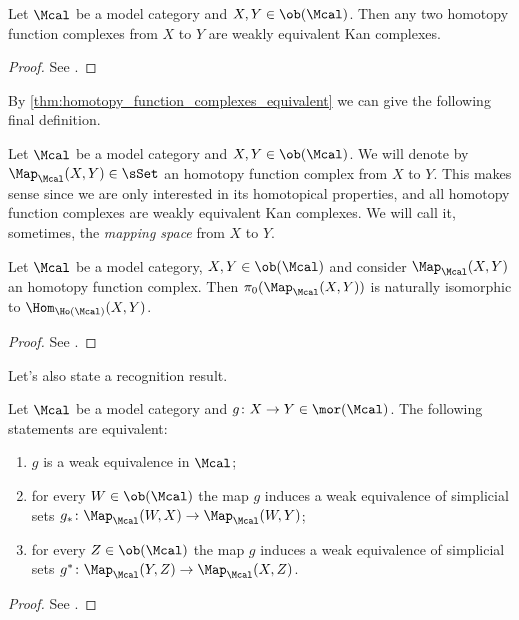         \begin{thm}
            \label{thm:homotopy_function_complexes_equivalent}
            Let $\Mcal$ be a model category and $X, Y \in \ob(\Mcal)$. Then any two homotopy function complexes from $X$ to $Y$ are weakly equivalent Kan complexes.
        \end{thm}
        \begin{proof}
            See \cite[Theorem~17.1.11, 17.2.11, 17.3.9, 17.4.6]{Hirs:loc}.
        \end{proof}

        By \cref{thm:homotopy_function_complexes_equivalent} we can give the following final definition.

        \begin{defn}
            \label{defn:mapping_space}
            Let $\Mcal$ be a model category and $X, Y \in \ob(\Mcal)$. We will denote by $\Map_{\Mcal}(X, Y) \in \sSet$ an homotopy function complex from $X$ to $Y$. This makes sense since we are only interested in its homotopical properties, and all homotopy function complexes are weakly equivalent Kan complexes. We will call it, sometimes, the \emph{mapping space} from $X$ to $Y$. 
        \end{defn}

        \begin{thm}
            \label{thm:mapping_space_pi0}
            Let $\Mcal$ be a model category, $X, Y \in \ob(\Mcal)$ and consider $\Map_{\Mcal}(X, Y)$ an homotopy function complex. Then $\pi_0( \Map_{\Mcal}(X, Y) )$ is naturally isomorphic to $\Hom_{\Ho(\Mcal)}(X, Y)$.
        \end{thm}
        \begin{proof}
            See \cite[Theorem~17.7.2]{Hirs:loc}.
        \end{proof}

        Let's also state a recognition result.
        \begin{thm}
            \label{thm:recognition_mapping_space}
            Let $\Mcal$ be a model category and $g\colon X \to Y \in \mor(\Mcal)$. The following statements are equivalent:
            \begin{enumerate}
                \item $g$ is a weak equivalence in $\Mcal$;
                \item for every $W \in \ob(\Mcal)$ the map $g$ induces a weak equivalence of simplicial sets $g_*\colon \Map_{\Mcal}(W, X) \to \Map_{\Mcal}(W, Y)$;
                \item for every $Z \in \ob(\Mcal)$ the map $g$ induces a weak equivalence of simplicial sets $g^*\colon \Map_{\Mcal}(Y, Z) \to \Map_{\Mcal}(X, Z)$.
            \end{enumerate}
        \end{thm}
        \begin{proof}
            See \cite[Theorem~1.7.16]{Vez:seminar}.
        \end{proof}

